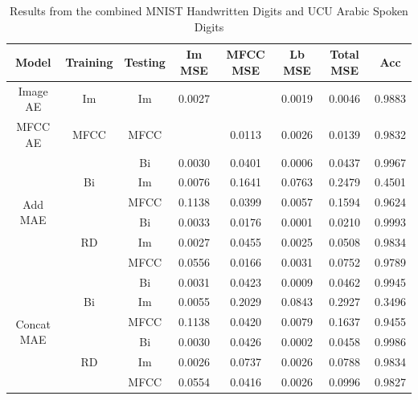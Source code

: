 \begin{table}
	\centering
		\begin{tabular}{|c|c|c|c|c|c|c|c|}
		\hline
		Model & Training & Testing & Im MSE & MFCC MSE & Lb MSE & Total MSE & Acc \\
		\hline
		Image AE & Im & Im & 0.0027	&	&0.0019	& 0.0046	&	0.9883\\ \hline
		MFCC AE & MFCC & MFCC & 	&0.0113	&	0.0026	&	0.0139	& 0.9832\\ \hline
		\multirow{6}{*}{Add MAE} & \multirow{3}{*}{Bi} & Bi &	0.0030	&	0.0401	&	0.0006	&	0.0437	&0.9967\\ \cline{3-8}
		&& Im &	0.0076	&	0.1641	&	0.0763	&	0.2479	&0.4501 \\ \cline{3-8}
		&& MFCC &	0.1138	&	0.0399	&	0.0057	&	0.1594	&0.9624 \\ \cline{2-8}
		& \multirow{3}{*}{RD} & Bi&	0.0033	&	0.0176	&	0.0001	&	0.0210	& 0.9993 \\ \cline{3-8}
		&& Im &	0.0027	&	0.0455	&	0.0025	&	0.0508	& 0.9834\\ \cline{3-8}
		&& MFCC & 0.0556	&	0.0166	&	0.0031	&	0.0752	&	0.9789 \\ \hline
		
		\multirow{6}{*}{Concat MAE} & \multirow{3}{*}{Bi} & Bi &	0.0031	&	0.0423	&	0.0009	& 0.0462	&	0.9945 \\ \cline{3-8}
		&& Im &	0.0055	&	0.2029	&	0.0843	&	0.2927	&	0.3496 \\ \cline{3-8}
		&& MFCC &0.1138	&	0.0420	&	0.0079	&0.1637	&	0.9455 \\ \cline{2-8}
		& \multirow{3}{*}{RD} & Bi &	0.0030	&	0.0426	&	0.0002	&	0.0458	&0.9986 \\ \cline{3-8}
		&& Im &	0.0026	&	0.0737	&	0.0026	& 0.0788	&	0.9834
\\ \cline{3-8}
		&& MFCC &	0.0554	&	0.0416	&	0.0026	&	0.0996	&0.9827
 \\ \hline
		\end{tabular}
		\caption{Results from the combined MNIST Handwritten Digits and UCU Arabic Spoken Digits}
		\label{tab:mnist_ucu_master_res}

\end{table}


